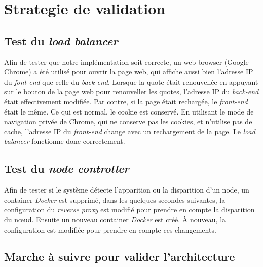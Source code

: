 \documentclass[a4paper,11pt,titlepage]{article}
\begin{document}
\section{Strategie de validation}
\subsection{Test du \emph{load balancer}}
Afin de tester que notre implémentation soit correcte, un web browser (Google Chrome) a été utilisé pour ouvrir la page web,
qui affiche aussi bien l'adresse IP du \emph{font-end} que celle du \emph{back-end}. Lorsque la quote était renouvellée en
appuyant sur le bouton de la page web pour renouveller les quotes, l'adresse IP du \emph{back-end} était effectivement modifiée.
Par contre, si la page était rechargée, le \emph{front-end} était le même. Ce qui est normal, le cookie est conservé. En
utilisant le mode de navigation privée de Chrome, qui ne conserve pas les cookies, et n'utilise pas de cache, l'adresse IP du
\emph{front-end} change avec un rechargement de la page. Le \emph{load balancer} fonctionne donc correctement.

\subsection{Test du \emph{node controller}}
Afin de tester si le système détecte l'apparition ou la disparition d'un node, un container \emph{Docker} est supprimé, dans
les quelques secondes suivantes, la configuration du \emph{reverse proxy} est modifié pour prendre en compte la disparition du
n\oe{}ud. Ensuite un nouveau container \emph{Docker} est créé. À nouveau, la configuration est modifiée pour prendre en compte
ces changements. 

\subsection{Marche à suivre pour valider l'architecture}
\end{document}
